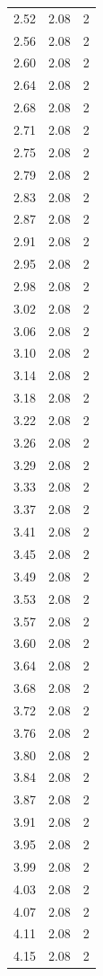 \begin{longtable}{lrr}
  2.52 & 2.08 & 2 \\
  2.56 & 2.08 & 2 \\
  2.60 & 2.08 & 2 \\
  2.64 & 2.08 & 2 \\
  2.68 & 2.08 & 2 \\
  2.71 & 2.08 & 2 \\
  2.75 & 2.08 & 2 \\
  2.79 & 2.08 & 2 \\
  2.83 & 2.08 & 2 \\
  2.87 & 2.08 & 2 \\
  2.91 & 2.08 & 2 \\
  2.95 & 2.08 & 2 \\
  2.98 & 2.08 & 2 \\
  3.02 & 2.08 & 2 \\
  3.06 & 2.08 & 2 \\
  3.10 & 2.08 & 2 \\
  3.14 & 2.08 & 2 \\
  3.18 & 2.08 & 2 \\
  3.22 & 2.08 & 2 \\
  3.26 & 2.08 & 2 \\
  3.29 & 2.08 & 2 \\
  3.33 & 2.08 & 2 \\
  3.37 & 2.08 & 2 \\
  3.41 & 2.08 & 2 \\
  3.45 & 2.08 & 2 \\
  3.49 & 2.08 & 2 \\
  3.53 & 2.08 & 2 \\
  3.57 & 2.08 & 2 \\
  3.60 & 2.08 & 2 \\
  3.64 & 2.08 & 2 \\
  3.68 & 2.08 & 2 \\
  3.72 & 2.08 & 2 \\
  3.76 & 2.08 & 2 \\
  3.80 & 2.08 & 2 \\
  3.84 & 2.08 & 2 \\
  3.87 & 2.08 & 2 \\
  3.91 & 2.08 & 2 \\
  3.95 & 2.08 & 2 \\
  3.99 & 2.08 & 2 \\
  4.03 & 2.08 & 2 \\
  4.07 & 2.08 & 2 \\
  4.11 & 2.08 & 2 \\
  4.15 & 2.08 & 2 \\

\end{longtable}
